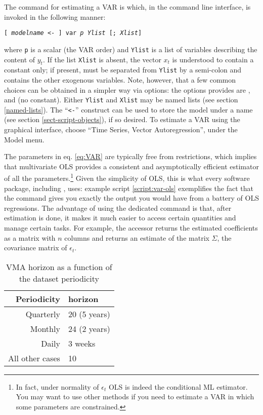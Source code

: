 The  command for estimating a VAR is  which, in
the command line interface, is invoked in the following manner:
\begin{flushleft}
    \texttt{[ \emph{modelname} \textless - ] var \emph{p} \emph{Ylist} [;
    \emph{Xlist}]}
\end{flushleft}
where \texttt{p} is a scalar (the VAR order) and \texttt{Ylist} is a
list of variables describing the content of $y_t$. If the list
\texttt{Xlist} is absent, the vector $x_t$ is understood to contain a
constant only; if present, must be separated from \texttt{Ylist} by a
semi-colon and contains the other exogenous variables. Note, however,
that a few common choices can be obtained in a simpler way via
options: the options  provides are ,
 and  (no constant). Either
\texttt{Ylist} and \texttt{Xlist} may be named lists (see section
\ref{named-lists}). The ``\texttt{\textless -}'' construct can be used
to store the model under a name (see section
\ref{sect-script-objects}), if so desired. To estimate a VAR using the
graphical interface, choose ``Time Series, Vector Autoregression'',
under the Model menu.

The parameters in eq. \eqref{eq:VAR} are typically free from
restrictions, which implies that multivariate OLS provides a
consistent and asymptotically efficient estimator of all the
parameters.\footnote{In fact, under normality of $\epsilon_t$ OLS is
  indeed the conditional ML estimator. You may want to use other
  methods if you need to estimate a VAR in which some parameters are
  constrained.}  Given the simplicity of OLS, this is what every
software package, including , uses: example script
\ref{script:var-ols} exemplifies the fact that the  command
gives you exactly the output you would have from a battery of OLS
regressions. The advantage of using the dedicated command is that,
after estimation is done, it makes it much easier to access certain
quantities and manage certain tasks. For example, the 
accessor returns the estimated coefficients as a matrix with $n$
columns and  returns an estimate of the matrix $\Sigma$,
the covariance matrix of $\epsilon_t$.

\begin{table}[htbp]
  \centering
  \begin{tabular}{rl}
    \hline
    Periodicity & horizon \\
    \hline
    Quarterly & 20 (5 years) \\
    Monthly & 24 (2 years) \\
    Daily & 3 weeks \\
    All other cases & 10 \\
    \hline
  \end{tabular}
  \caption{VMA horizon as a function of the dataset periodicity}
  \label{tab:var-horizon}
\end{table}

